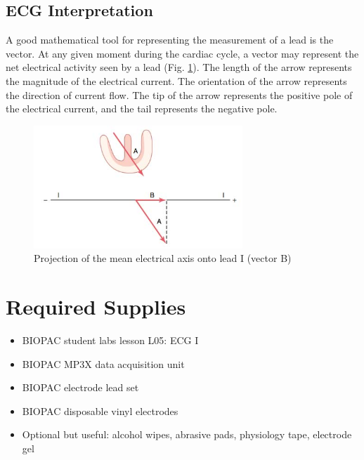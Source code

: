 \documentclass{article}
\begin{document}
\subsection*{ECG Interpretation}
A good mathematical tool for representing the measurement of a lead is the vector. At any given moment during the cardiac cycle, a vector may represent the net electrical activity seen by a lead (Fig. \ref{vector}). The length of the arrow represents the magnitude of the electrical current. The orientation of the arrow represents the direction of current flow. The tip of the arrow represents the positive pole of the electrical current, and the tail represents the negative pole.

\begin{figure}[h]
\centering\includegraphics[width=0.7\textwidth]{../images/ECG_II_3.jpg}
\caption{Projection of the mean electrical axis onto lead I (vector B)}
\label{vector}
\end{figure}


\section*{Required Supplies}
\begin{itemize}
	\item BIOPAC student labs lesson L05: ECG I
	\item BIOPAC MP3X data acquisition unit
	\item BIOPAC electrode lead set
	\item BIOPAC disposable vinyl electrodes
	\item Optional but useful: alcohol wipes, abrasive pads, physiology tape, electrode gel
\end{itemize}
\end{document}
